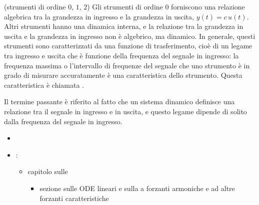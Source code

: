 \documentclass[letterpaper,10pt,italian]{jupyterBook}
\begin{document}
\sphinxAtStartPar
{} (strumenti di ordine \(0\), \(1\), \(2\)) Gli strumenti di ordine 0 forniscono una relazione algebrica tra la grandezza in ingresso e la grandezza in uscita, \(y(t) = c \, u(t)\). Altri strumenti hanno una dinamica interna, e la relazione tra la grandezza in uscita e la grandezza in ingresso non è algebrico, ma dinamico. In generale, questi strumenti sono caratterizzati da una funzione di trasferimento, cioè di un legame tra ingresso e uscita che è funzione della frequenza del segnale in ingresso: la frequenza massima \sphinxhyphen{} o l’intervallo di frequenze \sphinxhyphen{} del segnale che uno strumento è in grado di misurare accuratamente è una caratteristica dello strumento. Questa caratteristica è chiamata .

\sphinxAtStartPar
Il termine passante è riferito al fatto che un sistema dinamico definisce una relazione tra il segnale in ingresso e in uscita, e questo legame dipende di solito dalla frequenza del segnale in ingresso.
\begin{itemize}
\item {} 
\sphinxAtStartPar
{} {\hyperref[\detokenize{ch/todo:physics-hs-todo-fourier}]{}}

\item {} 
\sphinxAtStartPar
{}:
\begin{itemize}
\item {} 
\sphinxAtStartPar
capitolo sulle 
\begin{itemize}
\item {} 
\sphinxAtStartPar
sezione sulle ODE lineari e sulla  a forzanti armoniche e ad altre forzanti caratteristiche

\end{itemize}

\end{itemize}

\end{itemize}
 \label{exercise:instrument-order-zero-exercise}
\end{document}
